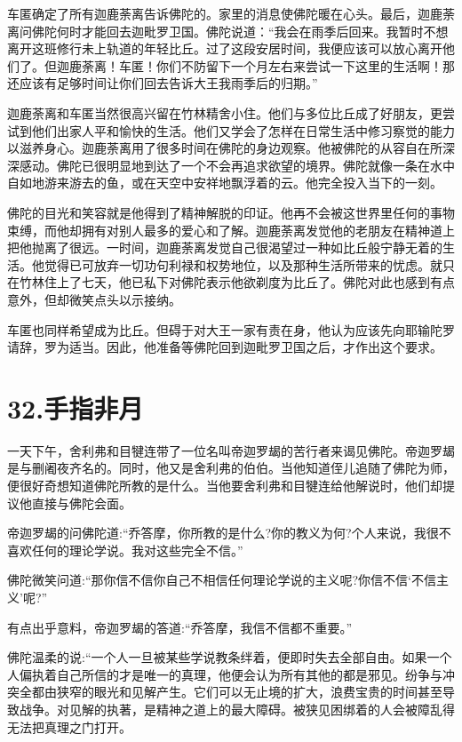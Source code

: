 \documentclass[12pt,twoside,openany]{book}
\begin{document}
车匿确定了所有迦鹿荼离告诉佛陀的。家里的消息使佛陀暖在心头。最后，迦鹿荼离问佛陀何时才能回去迦毗罗卫国。佛陀说道：“我会在雨季后回来。我暂时不想离开这班修行未上轨道的年轻比丘。过了这段安居时间，我便应该可以放心离开他们了。但迦鹿荼离！车匿！你们不防留下一个月左右来尝试一下这里的生活啊！那还应该有足够时间让你们回去告诉大王我雨季后的归期。”

迦鹿荼离和车匿当然很高兴留在竹林精舍小住。他们与多位比丘成了好朋友，更尝试到他们出家人平和愉快的生活。他们又学会了怎样在日常生活中修习察觉的能力以滋养身心。迦鹿荼离用了很多时间在佛陀的身边观察。他被佛陀的从容自在所深深感动。佛陀已很明显地到达了一个不会再追求欲望的境界。佛陀就像一条在水中自如地游来游去的鱼，或在天空中安祥地飘浮着的云。他完全投入当下的一刻。

佛陀的目光和笑容就是他得到了精神解脱的印证。他再不会被这世界里任何的事物束缚，而他却拥有对别人最多的爱心和了解。迦鹿荼离发觉他的老朋友在精神道上把他抛离了很远。一时间，迦鹿荼离发觉自己很渴望过一种如比丘般宁静无着的生活。他觉得已可放弃一切功句利禄和权势地位，以及那种生活所带来的忧虑。就只在竹林住上了七天，他已私下对佛陀表示他欲剃度为比丘了。佛陀对此也感到有点意外，但却微笑点头以示接纳。

车匿也同样希望成为比丘。但碍于对大王一家有责在身，他认为应该先向耶输陀罗请辞，罗为适当。因此，他准备等佛陀回到迦毗罗卫国之后，才作出这个要求。


\chapter{32.手指非月}\label{ch32}

一天下午，舍利弗和目犍连带了一位名叫帝迦罗朅的苦行者来谒见佛陀。帝迦罗朅是与删阇夜齐名的。同时，他又是舍利弗的伯伯。当他知道侄儿追随了佛陀为师，便很好奇想知道佛陀所教的是什么。当他要舍利弗和目犍连给他解说时，他们却提议他直接与佛陀会面。

帝迦罗朅的问佛陀道:“乔答摩，你所教的是什么?你的教义为何?个人来说，我很不喜欢任何的理论学说。我对这些完全不信。”

佛陀微笑问道:“那你信不信你自己不相信任何理论学说的主义呢?你信不信‘不信主义’呢?”

有点出乎意料，帝迦罗朅的答道:“乔答摩，我信不信都不重要。”

佛陀温柔的说:“一个人一旦被某些学说教条绊着，便即时失去全部自由。如果一个人偏执着自己所信的才是唯一的真理，他便会认为所有其他的都是邪见。纷争与冲突全都由狭窄的眼光和见解产生。它们可以无止境的扩大，浪费宝贵的时间甚至导致战争。对见解的执著，是精神之道上的最大障碍。被狭见困绑着的人会被障乱得无法把真理之门打开。
\end{document}
